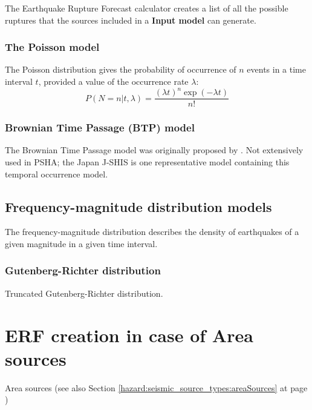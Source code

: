 The Earthquake Rupture Forecast calculator creates a list of all the possible 
ruptures that the sources included in a \textbf{Input model} can generate.

%
\subsubsection{The Poisson model}
The Poisson distribution gives the probability of occurrence of $n$ events in a 
time interval $t$, provided a value of the occurrence rate $\lambda$: 
\begin{equation}
P(N=n|t,\lambda)=\frac{(\lambda t)^{n}\exp(-\lambda t)}{n!}
\end{equation}
%
\subsubsection{Brownian Time Passage (BTP) model}
The Brownian Time Passage model was originally proposed by \cite{matthews2002}. 
Not extensively used in PSHA; the Japan J-SHIS is one representative model 
containing this temporal occurrence model.
%
\subsection{Frequency-magnitude distribution models}
The frequency-magnitude distribution describes the density of earthquakes of a 
given magnitude in a given time interval.
%
\subsubsection{Gutenberg-Richter distribution}
Truncated Gutenberg-Richter distribution.

%
\section{ERF creation in case of Area sources}
Area sources (see also Section \ref{hazard:seismic_source_types:areaSources} 
at page \pageref{hazard:seismic_source_types:areaSources}) 

%
